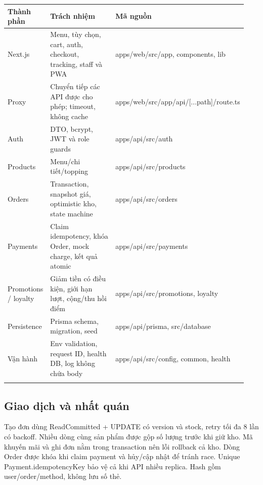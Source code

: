 \documentclass[a4paper,12pt,oneside]{report}
\begin{document}
\begingroup\fontsize{9}{11}\selectfont\setlength{\tabcolsep}{3pt}\renewcommand{\arraystretch}{1.35}
\begin{longtable}{@{}>{\raggedright\arraybackslash}p{0.14\linewidth} >{\raggedright\arraybackslash}p{0.36\linewidth} >{\raggedright\arraybackslash}p{0.44\linewidth}@{}}
\toprule
\textbf{Thành phần} & \textbf{Trách nhiệm} & \textbf{Mã nguồn} \\
\midrule\endhead
Next.js & Menu, tùy chọn, cart, auth, checkout, tracking, staff và PWA & apps/\allowbreak{}web/\allowbreak{}src/\allowbreak{}app, components, lib \\
\addlinespace[2pt]
Proxy & Chuyển tiếp các API được cho phép; timeout, không cache & apps/\allowbreak{}web/\allowbreak{}src/\allowbreak{}app/\allowbreak{}api/\allowbreak{}[...path]/\allowbreak{}route.ts \\
\addlinespace[2pt]
Auth & DTO, bcrypt, JWT và role guards & apps/\allowbreak{}api/\allowbreak{}src/\allowbreak{}auth \\
\addlinespace[2pt]
Products & Menu/\allowbreak{}chi tiết/\allowbreak{}topping & apps/\allowbreak{}api/\allowbreak{}src/\allowbreak{}products \\
\addlinespace[2pt]
Orders & Transaction, snapshot giá, optimistic kho, state machine & apps/\allowbreak{}api/\allowbreak{}src/\allowbreak{}orders \\
\addlinespace[2pt]
Payments & Claim idempotency, khóa Order, mock charge, kết quả atomic & apps/\allowbreak{}api/\allowbreak{}src/\allowbreak{}payments \\
\addlinespace[2pt]
Promotions /\allowbreak{} loyalty & Giảm tiền có điều kiện, giới hạn lượt, cộng/\allowbreak{}thu hồi điểm & apps/\allowbreak{}api/\allowbreak{}src/\allowbreak{}promotions, loyalty \\
\addlinespace[2pt]
Persistence & Prisma schema, migration, seed & apps/\allowbreak{}api/\allowbreak{}prisma, src/\allowbreak{}database \\
\addlinespace[2pt]
Vận hành & Env validation, request ID, health DB, log không chứa body & apps/\allowbreak{}api/\allowbreak{}src/\allowbreak{}config, common, health \\
\addlinespace[2pt]
\bottomrule\end{longtable}\endgroup

\subsection{Giao dịch và nhất quán}
Tạo đơn dùng ReadCommitted + UPDATE có version và stock, retry tối đa 8 lần có backoff. Nhiều dòng cùng sản phẩm được gộp số lượng trước khi giữ kho. Mã khuyến mãi và ghi đơn nằm trong transaction nên lỗi rollback cả kho. Dòng Order được khóa khi claim payment và hủy/\allowbreak{}cập nhật để tránh race. Unique Payment.idempotencyKey bảo vệ cả khi API nhiều replica. Hash gồm user/\allowbreak{}order/\allowbreak{}method, không lưu số thẻ.
\end{document}
